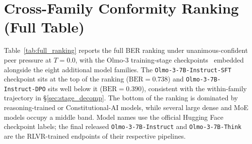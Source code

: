 \documentclass{article}
\begin{document}
\FloatBarrier

\section{Cross-Family Conformity Ranking (Full Table)}
\label{app:ranking}

Table~\ref{tab:full_ranking} reports the full BER ranking under unanimous-confident peer pressure at $T{=}0.0$, with the Olmo-3 training-stage checkpoints~\citep{olmo3} embedded alongside the eight additional model families. The \texttt{Olmo-3-7B-Instruct-SFT} checkpoint sits at the top of the ranking ($\text{BER} = 0.738$) and \texttt{Olmo-3-7B-Instruct-DPO} sits well below it ($\text{BER} = 0.390$), consistent with the within-family trajectory in \S\ref{sec:stage_decomp}. The bottom of the ranking is dominated by reasoning-trained or Constitutional-AI models, while several large dense and MoE models occupy a middle band. Model names use the official Hugging Face checkpoint labels; the final released \texttt{Olmo-3-7B-Instruct} and \texttt{Olmo-3-7B-Think} are the RLVR-trained endpoints of their respective pipelines.
\end{document}
